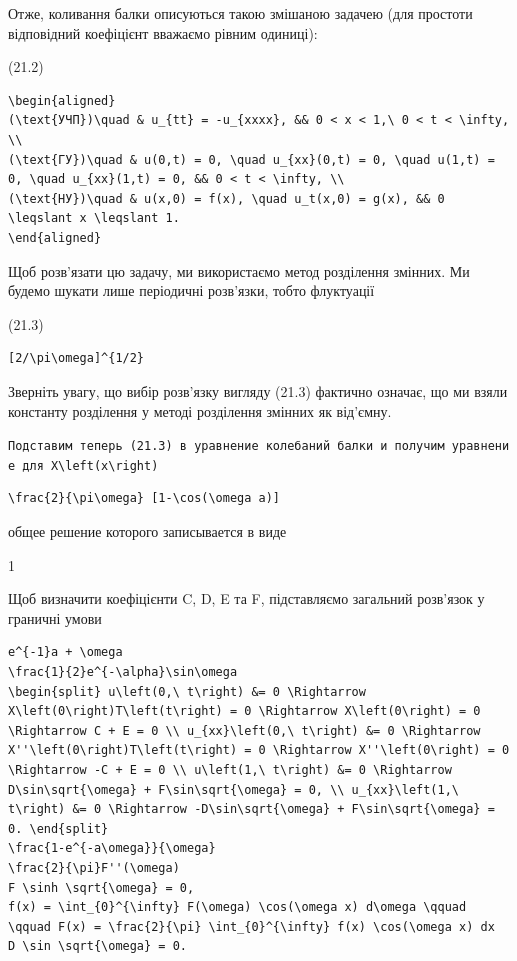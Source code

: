 \documentclass[
  ukrainian,
]{article}
\begin{document}
Отже, коливання балки описуються такою змішаною задачею (для простоти
відповідний коефіцієнт вважаємо рівним одиниці):

(21.2)

\begin{verbatim}
\begin{aligned}
(\text{УЧП})\quad & u_{tt} = -u_{xxxx}, && 0 < x < 1,\ 0 < t < \infty, \\
(\text{ГУ})\quad & u(0,t) = 0, \quad u_{xx}(0,t) = 0, \quad u(1,t) = 0, \quad u_{xx}(1,t) = 0, && 0 < t < \infty, \\
(\text{НУ})\quad & u(x,0) = f(x), \quad u_t(x,0) = g(x), && 0 \leqslant x \leqslant 1.
\end{aligned}
\end{verbatim}

Щоб розв'язати цю задачу, ми використаємо метод розділення змінних. Ми
будемо шукати лише періодичні розв'язки, тобто флуктуації

(21.3)

\begin{verbatim}
[2/\pi\omega]^{1/2}
\end{verbatim}

Зверніть увагу, що вибір розв'язку вигляду (21.3) фактично означає, що
ми взяли константу розділення у методі розділення змінних як від'ємну.

\texttt{Подставим\ теперь\ (21.3)\ в\ уравнение\ колебаний\ балки\ и\ получим\ уравнение\ для\ \textquotesingle{}X\textbackslash{}left(x\textbackslash{}right)\textquotesingle{}}

\begin{verbatim}
\frac{2}{\pi\omega} [1-\cos(\omega a)]
\end{verbatim}

общее решение которого записывается в виде

1

Щоб визначити коефіцієнти C, D, E та F, підставляємо загальний розв'язок
у граничні умови

\begin{verbatim}
e^{-1}a + \omega
\frac{1}{2}e^{-\alpha}\sin\omega
\begin{split} u\left(0,\ t\right) &= 0 \Rightarrow X\left(0\right)T\left(t\right) = 0 \Rightarrow X\left(0\right) = 0 \Rightarrow C + E = 0 \\ u_{xx}\left(0,\ t\right) &= 0 \Rightarrow X''\left(0\right)T\left(t\right) = 0 \Rightarrow X''\left(0\right) = 0 \Rightarrow -C + E = 0 \\ u\left(1,\ t\right) &= 0 \Rightarrow D\sin\sqrt{\omega} + F\sin\sqrt{\omega} = 0, \\ u_{xx}\left(1,\ t\right) &= 0 \Rightarrow -D\sin\sqrt{\omega} + F\sin\sqrt{\omega} = 0. \end{split}
\frac{1-e^{-a\omega}}{\omega}
\frac{2}{\pi}F''(\omega)
F \sinh \sqrt{\omega} = 0,
f(x) = \int_{0}^{\infty} F(\omega) \cos(\omega x) d\omega \qquad \qquad F(x) = \frac{2}{\pi} \int_{0}^{\infty} f(x) \cos(\omega x) dx
D \sin \sqrt{\omega} = 0.
\end{verbatim}
\end{document}
